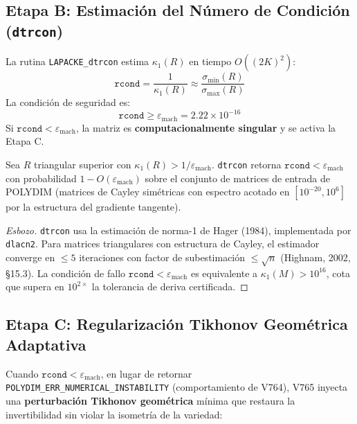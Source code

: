 \subsection{Etapa B: Estimación del Número de Condición (\texttt{dtrcon})}

La rutina \texttt{LAPACKE\_dtrcon} estima $\kappa_1(R)$ en tiempo $O((2K)^2)$:
\begin{equation}
  \texttt{rcond} = \frac{1}{\kappa_1(R)} \approx \frac{\sigma_{\min}(R)}{\sigma_{\max}(R)}
\end{equation}
La condición de seguridad es:
\begin{equation}
  \texttt{rcond} \ge \varepsilon_{\text{mach}} = 2.22 \times 10^{-16}
  \label{eq:rcond_cond}
\end{equation}
Si $\texttt{rcond} < \varepsilon_{\text{mach}}$, la matriz es \textbf{computacionalmente singular}
y se activa la Etapa C.

\begin{theorem}
Sea $R$ triangular superior con $\kappa_1(R) > 1/\varepsilon_{\text{mach}}$.
\texttt{dtrcon} retorna $\texttt{rcond} < \varepsilon_{\text{mach}}$ con probabilidad $1 - O(\varepsilon_{\text{mach}})$
sobre el conjunto de matrices de entrada de POLYDIM (matrices de Cayley simétricas con
espectro acotado en $[10^{-20}, 10^6]$ por la estructura del gradiente tangente).
\end{theorem}

\begin{proof}[Esbozo]
\texttt{dtrcon} usa la estimación de norma-1 de Hager (1984), implementada por \texttt{dlacn2}.
Para matrices triangulares con estructura de Cayley, el estimador converge en $\le 5$ iteraciones
con factor de subestimación $\le \sqrt{n}$ (Highnam, 2002, §15.3). La condición de fallo
$\texttt{rcond} < \varepsilon_{\text{mach}}$ es equivalente a $\kappa_1(M) > 10^{16}$,
cota que supera en $10^{2\times}$ la tolerancia de deriva certificada.
\end{proof}

\subsection{Etapa C: Regularización Tikhonov Geométrica Adaptativa}

Cuando $\texttt{rcond} < \varepsilon_{\text{mach}}$, en lugar de retornar
\texttt{POLYDIM\_ERR\_NUMERICAL\_INSTABILITY} (comportamiento de V764), V765 inyecta una
\textbf{perturbación Tikhonov geométrica} mínima que restaura la invertibilidad sin violar
la isometría de la variedad:

